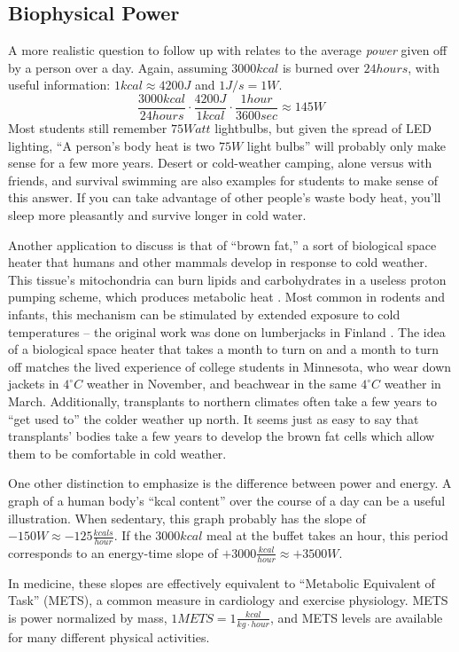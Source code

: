 \documentclass[12pt]{iopart}
\newcommand{\be}{\begin{equation}}
\newcommand{\ee}{\end{equation}}
\newcommand{\degC}{^{\circ}C}
\begin{document}
\subsection{Biophysical Power}
A more realistic question to follow up with relates to the average \textit{power} given off by a person over a day.  
Again, assuming $3000kcal$ is burned over $24 hours$, with useful information: $1 kcal \approx 4200J$ and $1 J/s=1W$.
\be
\frac{3000kcal}{24hours}\cdot\frac{4200J}{1kcal}\cdot\frac{1hour}{3600sec}\approx145W
\ee
Most students still remember $75Watt$ lightbulbs, but given the spread of LED lighting, ``A person's body heat is two $75W$ light bulbs'' will probably only make sense for a few more years.  Desert or cold-weather camping, alone versus with friends, and survival swimming are also examples for students to make sense of this answer.  If you can take advantage of other people's waste body heat, you'll sleep more pleasantly and survive longer in cold water.  

Another application to discuss is that of ``brown fat,'' a sort of biological space heater that humans and other mammals develop in response to cold weather.  This tissue's mitochondria can burn lipids and carbohydrates in a useless proton pumping scheme, which produces metabolic heat \cite{brown_fat_1,brown_fat_2,brown_fat_3,brown_fat_4}.  Most common in rodents and infants, this mechanism can be stimulated by extended exposure to cold temperatures -- the original work was done on lumberjacks in Finland \cite{finland_lumberjacks} .  The idea of a biological space heater that takes a month to turn on and a month to turn off matches the lived experience of college students in Minnesota, who wear down jackets in $4\degC$ weather in November, and beachwear in the same $4\degC$ weather in March.  Additionally, transplants to northern climates often take a few years to ``get used to'' the colder weather up north. It seems just as easy to say that transplants' bodies take a few years to develop the brown fat cells which allow them to be comfortable in cold weather.

One other distinction to emphasize is the difference between power and energy.  A graph of a human body's ``kcal content'' over the course of a day can be a useful illustration.  When sedentary, this graph probably has the slope of $-150W\approx -125 \frac{kcals}{hour}$.  If the $3000kcal$ meal at the buffet takes an hour, this period corresponds to an energy-time slope of 
$+3000\frac{kcal}{hour}\approx +3500W$.  

In medicine, these slopes are effectively equivalent to ``Metabolic Equivalent of Task'' (METS), a common measure in cardiology and exercise physiology.  METS is power normalized by mass, $1METS=1\frac{kcal}{kg\cdot hour}$, and METS levels are available for many different physical activities. \cite{METS}
\end{document}
